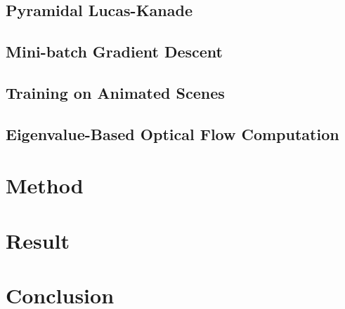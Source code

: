 \documentclass[]{article}
\begin{document}
\subsection{Pyramidal Lucas-Kanade}
\subsection{Mini-batch Gradient Descent}
\subsection{Training on Animated Scenes}
\subsection{Eigenvalue-Based Optical Flow Computation}

\section{Method}

\section{Result}

\section{Conclusion}

\pagebreak
\listoftables
\listoffigures
\printbibliography[heading=bibintoc]{}
\end{document}

